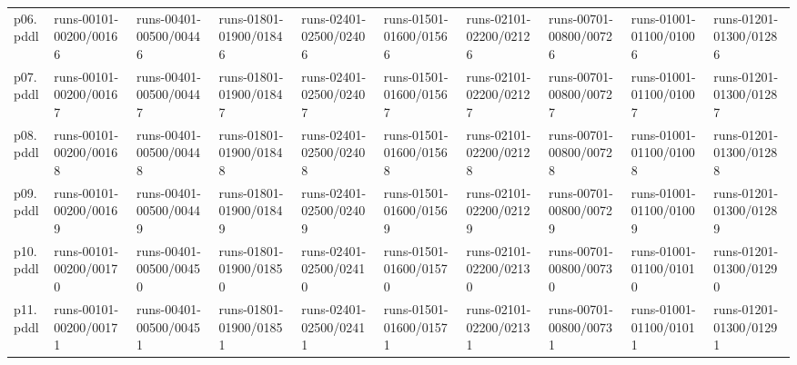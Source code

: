 \documentclass{article}
\begin{document}
\begin{tabular}{@{}lrrrrrrrrr@{}}
p06.pddl & \multicolumn{1}{|l|}{runs-00101-00200/00166} & \multicolumn{1}{|l|}{runs-00401-00500/00446} & \multicolumn{1}{|l|}{runs-01801-01900/01846} & \multicolumn{1}{|l|}{runs-02401-02500/02406} & \multicolumn{1}{|l|}{runs-01501-01600/01566} & \multicolumn{1}{|l|}{runs-02101-02200/02126} & \multicolumn{1}{|l|}{runs-00701-00800/00726} & \multicolumn{1}{|l|}{runs-01001-01100/01006} & \multicolumn{1}{|l|}{runs-01201-01300/01286} \\
p07.pddl & \multicolumn{1}{|l|}{runs-00101-00200/00167} & \multicolumn{1}{|l|}{runs-00401-00500/00447} & \multicolumn{1}{|l|}{runs-01801-01900/01847} & \multicolumn{1}{|l|}{runs-02401-02500/02407} & \multicolumn{1}{|l|}{runs-01501-01600/01567} & \multicolumn{1}{|l|}{runs-02101-02200/02127} & \multicolumn{1}{|l|}{runs-00701-00800/00727} & \multicolumn{1}{|l|}{runs-01001-01100/01007} & \multicolumn{1}{|l|}{runs-01201-01300/01287} \\
p08.pddl & \multicolumn{1}{|l|}{runs-00101-00200/00168} & \multicolumn{1}{|l|}{runs-00401-00500/00448} & \multicolumn{1}{|l|}{runs-01801-01900/01848} & \multicolumn{1}{|l|}{runs-02401-02500/02408} & \multicolumn{1}{|l|}{runs-01501-01600/01568} & \multicolumn{1}{|l|}{runs-02101-02200/02128} & \multicolumn{1}{|l|}{runs-00701-00800/00728} & \multicolumn{1}{|l|}{runs-01001-01100/01008} & \multicolumn{1}{|l|}{runs-01201-01300/01288} \\
p09.pddl & \multicolumn{1}{|l|}{runs-00101-00200/00169} & \multicolumn{1}{|l|}{runs-00401-00500/00449} & \multicolumn{1}{|l|}{runs-01801-01900/01849} & \multicolumn{1}{|l|}{runs-02401-02500/02409} & \multicolumn{1}{|l|}{runs-01501-01600/01569} & \multicolumn{1}{|l|}{runs-02101-02200/02129} & \multicolumn{1}{|l|}{runs-00701-00800/00729} & \multicolumn{1}{|l|}{runs-01001-01100/01009} & \multicolumn{1}{|l|}{runs-01201-01300/01289} \\
p10.pddl & \multicolumn{1}{|l|}{runs-00101-00200/00170} & \multicolumn{1}{|l|}{runs-00401-00500/00450} & \multicolumn{1}{|l|}{runs-01801-01900/01850} & \multicolumn{1}{|l|}{runs-02401-02500/02410} & \multicolumn{1}{|l|}{runs-01501-01600/01570} & \multicolumn{1}{|l|}{runs-02101-02200/02130} & \multicolumn{1}{|l|}{runs-00701-00800/00730} & \multicolumn{1}{|l|}{runs-01001-01100/01010} & \multicolumn{1}{|l|}{runs-01201-01300/01290} \\
p11.pddl & \multicolumn{1}{|l|}{runs-00101-00200/00171} & \multicolumn{1}{|l|}{runs-00401-00500/00451} & \multicolumn{1}{|l|}{runs-01801-01900/01851} & \multicolumn{1}{|l|}{runs-02401-02500/02411} & \multicolumn{1}{|l|}{runs-01501-01600/01571} & \multicolumn{1}{|l|}{runs-02101-02200/02131} & \multicolumn{1}{|l|}{runs-00701-00800/00731} & \multicolumn{1}{|l|}{runs-01001-01100/01011} & \multicolumn{1}{|l|}{runs-01201-01300/01291} \\

\end{tabular}
\end{document}
